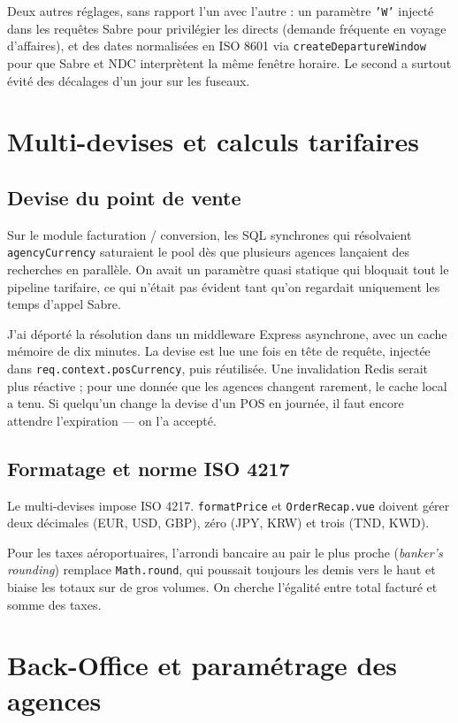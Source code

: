 Deux autres réglages, sans rapport l'un avec l'autre : un paramètre \texttt{'W'} injecté dans les requêtes Sabre pour privilégier les directs (demande fréquente en voyage d'affaires), et des dates normalisées en ISO 8601 via \texttt{createDepartureWindow} pour que Sabre et NDC interprètent la même fenêtre horaire. Le second a surtout évité des décalages d'un jour sur les fuseaux.

\chapter{Multi-devises et calculs tarifaires}
\label{chap:architecture_financiere}

\section{Devise du point de vente}

Sur le module facturation / conversion, les SQL synchrones qui résolvaient \texttt{agencyCurrency} saturaient le pool dès que plusieurs agences lançaient des recherches en parallèle. On avait un paramètre quasi statique qui bloquait tout le pipeline tarifaire, ce qui n'était pas évident tant qu'on regardait uniquement les temps d'appel Sabre.

J'ai déporté la résolution dans un middleware Express asynchrone, avec un cache mémoire de dix minutes. La devise est lue une fois en tête de requête, injectée dans \texttt{req.context.posCurrency}, puis réutilisée. Une invalidation Redis serait plus réactive ; pour une donnée que les agences changent rarement, le cache local a tenu. Si quelqu'un change la devise d'un POS en journée, il faut encore attendre l'expiration --- on l'a accepté.

\section{Formatage et norme ISO 4217}

Le multi-devises impose ISO 4217. \texttt{formatPrice} et \texttt{OrderRecap.vue} doivent gérer deux décimales (EUR, USD, GBP), zéro (JPY, KRW) et trois (TND, KWD).

Pour les taxes aéroportuaires, l'arrondi bancaire au pair le plus proche (\textit{banker's rounding}) remplace \texttt{Math.round}, qui poussait toujours les demis vers le haut et biaise les totaux sur de gros volumes. On cherche l'égalité entre total facturé et somme des taxes.

\chapter{Back-Office et paramétrage des agences}
\label{chap:backoffice_admin}


